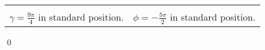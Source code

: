 \documentclass[12pt]{ximera}
\begin{document}
\begin{example}
\begin{enumerate}
\begin{center}
\begin{tabular}{cc}
\hspace{.5in}

\scriptsize
\normalsize
 

\\

$\gamma = \frac{9 \pi}{4}$ in standard position. & \hspace{1in} $\phi = -\frac{5 \pi}{2}$ in standard position.   \\

\end{tabular}

\end{center}

\end{enumerate}
\qed

\end{example}
\end{document}
